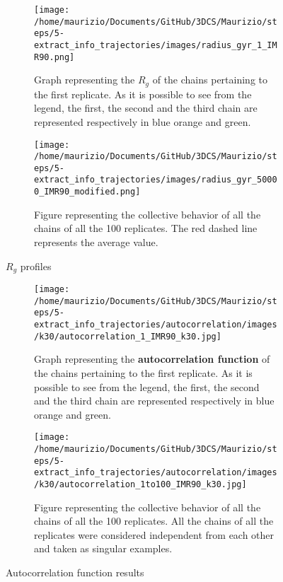 \begin{figure}[H]
    \centering
    
    \begin{subfigure}{0.49\textwidth}
      \texttt{[image: /home/maurizio/Documents/GitHub/3DCS/Maurizio/steps/5-extract\_info\_trajectories/images/radius\_gyr\_1\_IMR90.png]}
      \caption{Graph representing the $R_g$ of the chains pertaining to the first replicate. As it is possible to see from the legend, the first, the second and the third chain are represented respectively in blue orange and green.}
      \label{fig:RG first replicate}
    \end{subfigure}
    \hfill
    \begin{subfigure}{0.49\textwidth}
      \texttt{[image: /home/maurizio/Documents/GitHub/3DCS/Maurizio/steps/5-extract\_info\_trajectories/images/radius\_gyr\_50000\_IMR90\_modified.png]}
      \caption{Figure representing the collective behavior of all the chains of all the 100 replicates. The red dashed line represents the average value.}
      \label{fig:RG collective replicates}
    \end{subfigure}
  
    \caption{$R_g$ profiles}
    \label{fig:RG figures}
\end{figure}

\begin{figure}[H]
    \centering
    
    \begin{subfigure}{0.75\textwidth}
      \texttt{[image: /home/maurizio/Documents/GitHub/3DCS/Maurizio/steps/5-extract\_info\_trajectories/autocorrelation/images/k30/autocorrelation\_1\_IMR90\_k30.jpg]}
      \caption{Graph representing the \textbf{autocorrelation function }of the chains pertaining to the first replicate. As it is possible to see from the legend, the first, the second and the third chain are represented respectively in blue orange and green.}
      \label{fig:autocorrelation function first replicate}
    \end{subfigure}
    \hfill
    \begin{subfigure}{0.75\textwidth}
      \texttt{[image: /home/maurizio/Documents/GitHub/3DCS/Maurizio/steps/5-extract\_info\_trajectories/autocorrelation/images/k30/autocorrelation\_1to100\_IMR90\_k30.jpg]}
      \caption{Figure representing the collective behavior of all the chains of all the 100 replicates. All the chains of all the replicates were considered independent from each other and taken as singular examples.}
      \label{fig:autocorrelation function collective replicates}
    \end{subfigure}
    \caption{Autocorrelation function results}
  \end{figure}

